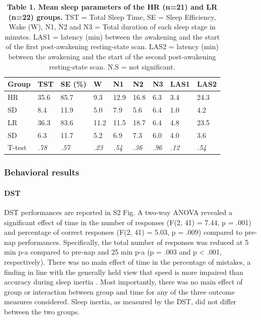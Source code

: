\begin{table}[!htbp]
    \caption*{\textbf{Table 1. Mean sleep parameters of the HR (n=21) and LR (n=22) groups.} TST = Total Sleep Time, SE = Sleep Efficiency, Wake (W), N1, N2 and N3 = Total duration of each sleep stage in minutes. LAS1 = latency (min) between the awakening and the start of the first post-awakening resting-state scan. LAS2 = latency (min) between the awakening and the start of the second post-awakening resting-state scan. N.S = not significant.}
    \begin{tabularx}{\textwidth}{lXXXXXXXX}
    \toprule
    Group  & TST          & SE (\%)      & W            & N1           & N2           & N3           & LAS1         & LAS2         \\ \midrule
    HR     & 35.6         & 85.7         & 9.3          & 12.9         & 16.8         & 6.3          & 3.4          & 24.3         \\
    SD     & 8.4          & 11.9         & 5.0          & 7.9          & 5.6          & 6.4          & 1.0          & 4.2          \\
    LR     & 36.3         & 83.6         & 11.2         & 11.5         & 18.7         & 6.4          & 4.8          & 23.5         \\
    SD     & 6.3          & 11.7         & 5.2          & 6.9          & 7.3          & 6.0          & 4.0          & 3.6          \\
    T-test & \textit{.78} & \textit{.57} & \textit{.23} & \textit{.54} & \textit{.36} & \textit{.96} & \textit{.12} & \textit{.54} \\ \bottomrule
    \end{tabularx}%
\end{table}

\subsubsection*{Behavioral results}
\paragraph{DST}
DST performances are reported in S2 Fig. A two-way ANOVA revealed a significant effect of time in the number of responses (F(2, 41) = 7.44, p = .001) and percentage of correct responses (F(2, 41) = 5.03, p = .009) compared to pre-nap performances.  Specifically, the total number of responses was reduced at 5 min p-a compared to pre-nap and 25 min p-a (p = .003 and p < .001, respectively). There was no main effect of time in the percentage of mistakes, a finding in line with the generally held view that speed is more impaired than accuracy during sleep inertia \citep{trotti_waking_2016}. Most importantly, there was no main effect of group or interaction between group and time for any of the three outcome measures considered. Sleep inertia, as measured by the DST, did not differ between the two groups.

